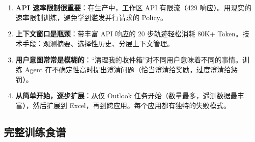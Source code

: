 \begin{intuitionbox}
\begin{enumerate}
\textbf{缓解措施}：多层验证（格式 + 内容 + 语义正确性）。
  \item \textbf{API 速率限制很重要}：在生产中，工作区 API 有限流（429 响应）。用现实的速率限制训练，避免学到滥发并行请求的 Policy。
  \item \textbf{上下文窗口是瓶颈}：带丰富 API 响应的 20 步轨迹轻松消耗 80K+ Token。技术手段：观测摘要、选择性历史、分层上下文管理。
  \item \textbf{用户意图常常是模糊的}：``清理我的收件箱''对不同用户意味着不同的事情。训练 Agent 在不确定性高时提出澄清问题（恰当澄清给奖励，过度澄清给惩罚）。
  \item \textbf{从简单开始，逐步扩展}：从仅 Outlook 任务开始（数量最多，遥测数据最丰富），然后扩展到 Excel，再到跨应用。每个应用都有独特的失败模式。
\end{enumerate}
\end{intuitionbox}

\subsection{完整训练食谱}
\label{complete-training-recipe}

